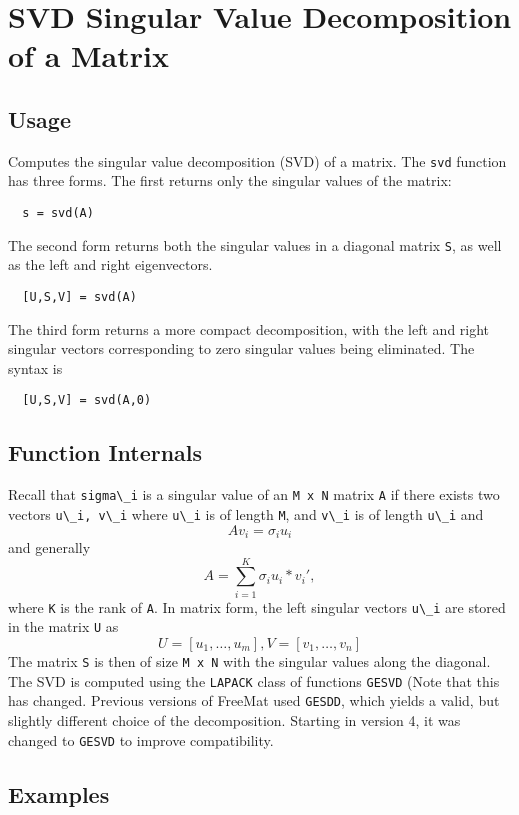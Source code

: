 \section{SVD Singular Value Decomposition of a Matrix}

\subsection{Usage}

Computes the singular value decomposition (SVD) of a matrix.  The 
\verb|svd| function has three forms.  The first returns only the singular
values of the matrix:
\begin{verbatim}
  s = svd(A)
\end{verbatim}
The second form returns both the singular values in a diagonal
matrix \verb|S|, as well as the left and right eigenvectors.
\begin{verbatim}
  [U,S,V] = svd(A)
\end{verbatim}
The third form returns a more compact decomposition, with the
left and right singular vectors corresponding to zero singular
values being eliminated.  The syntax is
\begin{verbatim}
  [U,S,V] = svd(A,0)
\end{verbatim}
\subsection{Function Internals}

Recall that \verb|sigma\_i| is a singular value of an \verb|M x N|
matrix \verb|A| if there exists two vectors \verb|u\_i, v\_i| where \verb|u\_i| is
of length \verb|M|, and \verb|v\_i| is of length \verb|u\_i| and
\[
  A v_i = \sigma_i u_i
\]
and generally
\[
  A = \sum_{i=1}^{K} \sigma_i u_i*v_i',
\]
where \verb|K| is the rank of \verb|A|.  In matrix form, the left singular
vectors \verb|u\_i| are stored in the matrix \verb|U| as
\[
  U = [u_1,\ldots,u_m], V = [v_1,\ldots,v_n]
\]
The matrix \verb|S| is then of size \verb|M x N| with the singular
values along the diagonal.  The SVD is computed using the 
\verb|LAPACK| class of functions \verb|GESVD| (Note that this has
changed.  Previous versions of FreeMat used \verb|GESDD|, which
yields a valid, but slightly different choice of the decomposition.
Starting in version 4, it was changed to \verb|GESVD| to improve
compatibility.
\subsection{Examples}

